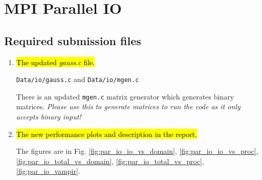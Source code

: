 \section{MPI Parallel IO}
\subsection{Required submission files}
\begin{enumerate}
  \item \hl{The updated \emph{gauss.c} file.}
  
  \verb!Data/io/gauss.c! and \verb!Data/io/mgen.c!
  
  There is an updated \verb!mgen.c! matrix generator which generates binary matrices.
  \emph{Please use this to generate matrices to run the code as it only accepts binary input!}

  \item \hl{The new performance plots and description in the report.}
  
  The figures are in Fig. \ref{fig:par_io_io_vs_domain}, \ref{fig:par_io_io_vs_proc},
  \ref{fig:par_io_total_vs_domain}, \ref{fig:par_io_total_vs_proc}, \ref{fig:par_io_vampir}.
\end{enumerate}

